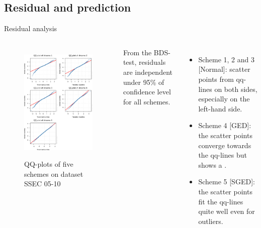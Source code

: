 \subsection{Residual and prediction}
\begin{frame}{Residual analysis}
  \begin{columns} %
    \begin{figure}[htbp]
      \centering
      \caption{QQ-plots of five schemes on dataset SSEC 05-10}
      \includegraphics[width = .76\columnwidth]{fig/ssec0510_pred_qqplot_agg_colored.eps}
      \label{fig:QQ-plot of five schemes for dataset SSEC 05-10}
    \end{figure}
    
    From the BDS-test, residuals are independent under 95\% of confidence level for all schemes.
    \begin{itemize}
      \item Scheme 1, 2 and 3 [Normal]: scatter points  from qq-lines on both sides, especially on the left-hand side.
      \item Scheme 4 [GED]: the scatter points converge towards the qq-lines but shows a .
      \item Scheme 5 [SGED]: the scatter points fit the qq-lines quite well even for outliers.
    \end{itemize}

  \end{columns}
\end{frame}
  
